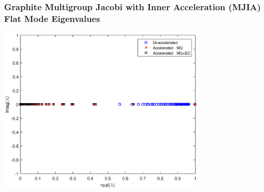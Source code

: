 \documentclass[compress,10pt]{beamer}
\begin{document}
\begin{frame}[t]
{}
{
\frametitle{\small Graphite Multigroup Jacobi with Inner Acceleration (MJIA) Flat Mode Eigenvalues}
\hspace*{1.1cm}
\includegraphics[width=0.75\textwidth]{images/IM1_Graph_FA_MJIA.eps}
}
\end{frame}
\end{document}

